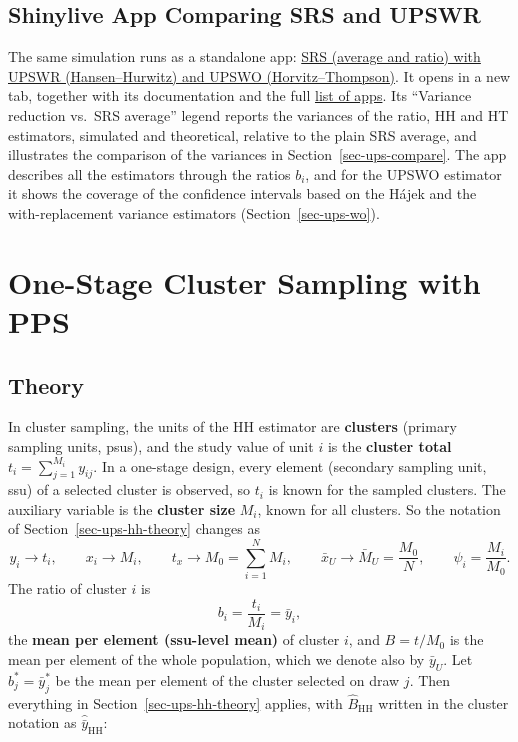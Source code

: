 \documentclass[
  letterpaper,
  DIV=11,
  numbers=noendperiod]{scrreprt}
\renewcommand{\[}{\begin{equation}}
\renewcommand{\]}{\end{equation}}
\begin{document}
\subsection{Shinylive App Comparing SRS and UPSWR}\label{sec-ups-app}

The same simulation runs as a standalone app:
\href{../shinylives_sampling/app-ups.html}{SRS (average and ratio) with
UPSWR (Hansen--Hurwitz) and UPSWO (Horvitz--Thompson)}. It opens in a
new tab, together with its documentation and the full
\href{../shinylives_sampling/index.html}{list of apps}. Its ``Variance
reduction vs.~SRS average'' legend reports the variances of the ratio,
HH and HT estimators, simulated and theoretical, relative to the plain
SRS average, and illustrates the comparison of the variances in
Section~\ref{sec-ups-compare}. The app describes all the estimators
through the ratios \(b_i\), and for the UPSWO estimator it shows the
coverage of the confidence intervals based on the Hájek and the
with-replacement variance estimators (Section~\ref{sec-ups-wo}).

\section{One-Stage Cluster Sampling with PPS}\label{sec-ups-cluster}

\subsection{Theory}\label{sec-ups-cluster-theory}

In cluster sampling, the units of the HH estimator are \textbf{clusters}
(primary sampling units, psus), and the study value of unit \(i\) is the
\textbf{cluster total} \(t_i=\sum_{j=1}^{M_i}y_{ij}\). In a one-stage
design, every element (secondary sampling unit, ssu) of a selected
cluster is observed, so \(t_i\) is known for the sampled clusters. The
auxiliary variable is the \textbf{cluster size} \(M_i\), known for all
clusters. So the notation of Section~\ref{sec-ups-hh-theory} changes as
\[
y_i \to t_i,\qquad x_i\to M_i,\qquad t_x\to M_0=\sum_{i=1}^N M_i,\qquad \bar{x}_U\to\bar{M}_U=\frac{M_0}{N},
\qquad \psi_i=\frac{M_i}{M_0}.
\] The ratio of cluster \(i\) is \[
b_i=\frac{t_i}{M_i}=\bar{y}_i ,
\] the \textbf{mean per element (ssu-level mean)} of cluster \(i\), and
\(B=t/M_0\) is the mean per element of the whole population, which we
denote also by \(\bar{y}_U\). Let \(b_j^*=\bar{y}_j^*\) be the mean per
element of the cluster selected on draw \(j\). Then everything in
Section~\ref{sec-ups-hh-theory} applies, with \(\hat{B}_{\mathrm{HH}}\)
written in the cluster notation as \(\hat{\bar{y}}_{\mathrm{HH}}\):
\end{document}
